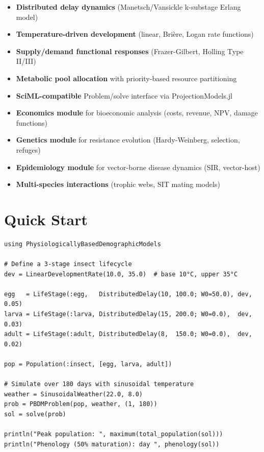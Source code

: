 \begin{itemize}
\item \textbf{Distributed delay dynamics} (Manetsch/Vansickle k-substage Erlang model)


\item \textbf{Temperature-driven development} (linear, Brière, Logan rate functions)


\item \textbf{Supply/demand functional responses} (Frazer-Gilbert, Holling Type II/III)


\item \textbf{Metabolic pool allocation} with priority-based resource partitioning


\item \textbf{SciML-compatible} Problem/solve interface via ProjectionModels.jl


\item \textbf{Economics module} for bioeconomic analysis (costs, revenue, NPV, damage functions)


\item \textbf{Genetics module} for resistance evolution (Hardy-Weinberg, selection, refuges)


\item \textbf{Epidemiology module} for vector-borne disease dynamics (SIR, vector-host)


\item \textbf{Multi-species interactions} (trophic webs, SIT mating models)

\end{itemize}


\section{Quick Start}



\label{15530337615267817360}{}



\begin{verbatim}
using PhysiologicallyBasedDemographicModels

# Define a 3-stage insect lifecycle
dev = LinearDevelopmentRate(10.0, 35.0)  # base 10°C, upper 35°C

egg   = LifeStage(:egg,   DistributedDelay(10, 100.0; W0=50.0), dev, 0.05)
larva = LifeStage(:larva, DistributedDelay(15, 200.0; W0=0.0),  dev, 0.03)
adult = LifeStage(:adult, DistributedDelay(8,  150.0; W0=0.0),  dev, 0.02)

pop = Population(:insect, [egg, larva, adult])

# Simulate over 180 days with sinusoidal temperature
weather = SinusoidalWeather(22.0, 8.0)
prob = PBDMProblem(pop, weather, (1, 180))
sol = solve(prob)

println("Peak population: ", maximum(total_population(sol)))
println("Phenology (50% maturation): day ", phenology(sol))
\end{verbatim}



